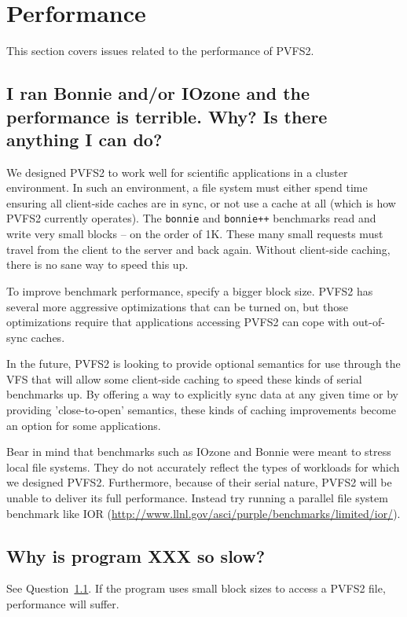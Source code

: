 \documentclass[11pt,letterpaper]{article}
\begin{document}
%
%
\section{Performance}

This section covers issues related to the performance of PVFS2.

\subsection{I ran Bonnie and/or IOzone and the performance is terrible.
Why? Is there anything I can do?}
\label{sec:badperf}

We designed PVFS2 to work well for scientific applications in a cluster
environment.  In such an environment, a file system must either spend
time ensuring all client-side caches are in sync, or not use a cache
at all (which is how PVFS2 currently operates).  The \texttt{bonnie}
and \texttt{bonnie++} benchmarks read and write very small blocks --
on the order of 1K.  These many small requests must travel from the
client to the server and back again.  Without client-side caching,
there is no sane way to speed this up.

To improve benchmark performance, specify a bigger block size.   PVFS2
has several more aggressive optimizations that can be turned on, but
those optimizations require that applications accessing PVFS2 can cope
with out-of-sync caches.  

In the future, PVFS2 is looking to provide optional semantics for use
through the VFS that will allow some client-side caching to speed these
kinds of serial benchmarks up.  By offering a way to explicitly sync
data at any given time or by providing 'close-to-open' semantics, these
kinds of caching improvements become an option for some applications.

Bear in mind that benchmarks such as IOzone and Bonnie were meant to
stress local file systems.   They do not accurately reflect the types of
workloads for which we designed PVFS2.  Furthermore, because of their
serial nature, PVFS2 will be unable to deliver its full performance.
Instead try running a parallel file system benchmark like IOR
(\url{http://www.llnl.gov/asci/purple/benchmarks/limited/ior/}).


\subsection{Why is program XXX so slow?}
\label{sec:why_so_slow}
See Question~\ref{sec:badperf}.  If the program uses small block sizes to
access a PVFS2 file, performance will suffer.  
\end{document}
